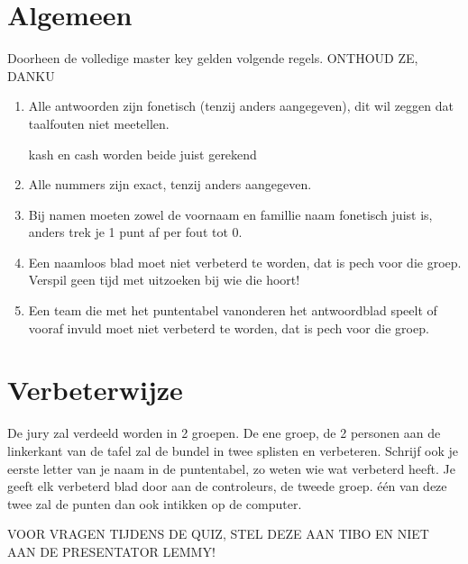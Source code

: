 \documentclass{exam}
\begin{document}
\section*{Algemeen}
Doorheen de volledige master key gelden volgende regels.
\large{ONTHOUD ZE, DANKU }
\begin{enumerate}
\item{Alle antwoorden zijn fonetisch (tenzij anders aangegeven), dit wil zeggen dat taalfouten niet meetellen.\par kash en cash worden beide juist gerekend}
\item{Alle nummers zijn exact, tenzij anders aangegeven.}
\item{Bij namen moeten zowel de voornaam en famillie naam fonetisch juist is, anders trek je 1 punt af per fout tot 0. }
\item{Een naamloos blad moet niet verbeterd te worden, dat is pech voor die groep. Verspil geen tijd met uitzoeken bij wie die hoort!}
\item{Een team die met het puntentabel vanonderen het antwoordblad speelt of vooraf invuld moet niet verbeterd te worden, dat is pech voor die groep.}
\end{enumerate}
\section*{Verbeterwijze}
De jury zal verdeeld worden in 2 groepen. De ene groep, de 2 personen aan de linkerkant van de tafel zal de bundel in twee splisten en verbeteren. Schrijf ook je eerste letter van je naam in de puntentabel, zo weten wie wat verbeterd heeft. Je geeft elk verbeterd blad door aan de controleurs, de tweede groep. één van deze twee zal de punten dan ook intikken op de computer.\linebreak\par

\large{VOOR VRAGEN TIJDENS DE QUIZ, STEL DEZE AAN TIBO EN NIET AAN DE PRESENTATOR LEMMY!}
\newpage

\newpage

\newpage

\newpage

\newpage

\newpage

\newpage

\newpage

\newpage

\newpage

%
%
%
%
\end{document}
